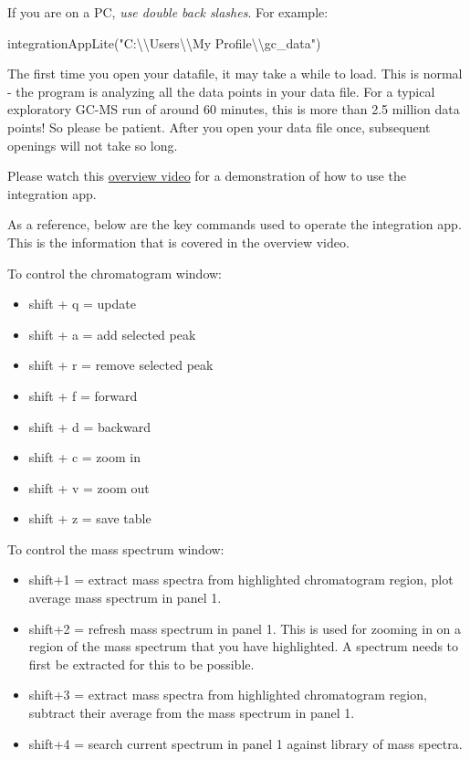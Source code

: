 \documentclass[
]{krantz}
\newenvironment{Shaded}{\begin{snugshade}}{\end{snugshade}}
\newcommand{\FunctionTok}[1]{\textcolor[rgb]{0.00,0.00,0.00}{#1}}
\newcommand{\NormalTok}[1]{#1}
\newcommand{\SpecialCharTok}[1]{\textcolor[rgb]{0.00,0.00,0.00}{#1}}
\newcommand{\StringTok}[1]{\textcolor[rgb]{0.31,0.60,0.02}{#1}}
\providecommand{\tightlist}{%
  \setlength{\itemsep}{0pt}\setlength{\parskip}{0pt}}
\begin{document}
\hfill\break

If you are on a PC, \emph{use double back slashes}. For example:

\begin{Shaded}
\begin{Highlighting}[]
\FunctionTok{integrationAppLite}\NormalTok{(}\StringTok{"C:}\SpecialCharTok{\textbackslash{}\textbackslash{}}\StringTok{Users}\SpecialCharTok{\textbackslash{}\textbackslash{}}\StringTok{My Profile}\SpecialCharTok{\textbackslash{}\textbackslash{}}\StringTok{gc\_data"}\NormalTok{)}
\end{Highlighting}
\end{Shaded}

\hfill\break

The first time you open your datafile, it may take a while to load. This is normal - the program is analyzing all the data points in your data file. For a typical exploratory GC-MS run of around 60 minutes, this is more than 2.5 million data points! So please be patient. After you open your data file once, subsequent openings will not take so long.

Please watch this \href{https://drive.google.com/file/d/1Jv-EEwaLIxpQJSVZGD1NFkfZGOUaayKo/view?usp=sharing}{overview video} for a demonstration of how to use the integration app.

As a reference, below are the key commands used to operate the integration app. This is the information that is covered in the overview video.

To control the chromatogram window:

\begin{itemize}
\tightlist
\item
  shift + q = update
\item
  shift + a = add selected peak
\item
  shift + r = remove selected peak
\item
  shift + f = forward
\item
  shift + d = backward
\item
  shift + c = zoom in
\item
  shift + v = zoom out
\item
  shift + z = save table
\end{itemize}

To control the mass spectrum window:

\begin{itemize}
\tightlist
\item
  shift+1 = extract mass spectra from highlighted chromatogram region, plot average mass spectrum in panel 1.
\item
  shift+2 = refresh mass spectrum in panel 1. This is used for zooming in on a region of the mass spectrum that you have highlighted. A spectrum needs to first be extracted for this to be possible.
\item
  shift+3 = extract mass spectra from highlighted chromatogram region, subtract their average from the mass spectrum in panel 1.
\item
  shift+4 = search current spectrum in panel 1 against library of mass spectra.
\end{itemize}
\end{document}
